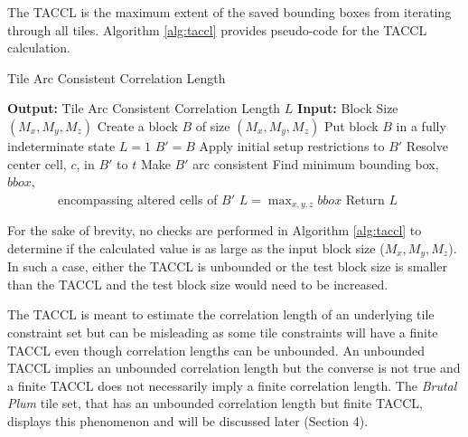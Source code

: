 The TACCL is the maximum extent of the saved bounding boxes from iterating through all tiles.
Algorithm \ref{alg:taccl} provides pseudo-code for the TACCL calculation.

\begin{algorithm}
  \caption{Tile Arc Consistent Correlation Length}
  \label{alg:taccl}
  \begin{algorithmic}
    \State \textbf{Output:} Tile Arc Consistent Correlation Length $L$
    \State \textbf{Input:} Block Size $(M _ x, M _ y, M _ z)$
    \State Create a block $B$ of size $(M _ x, M _ y, M _ z)$
    \State Put block $B$ in a fully indeterminate state
    \State $L=1$
      \State $B' = B$
      \State Apply initial setup restrictions to $B'$
      \State Resolve center cell, $c$, in $B'$ to $t$
      \State Make $B'$ arc consistent
      \State Find minimum bounding box, $bbox$, \\ \ \ \ \ \ \ \ \ encompassing altered cells of $B'$
        \State $L = \max _ { x, y, z } bbox $
      \EndIf
    \EndFor
    \State Return $L$
  \end{algorithmic}
\end{algorithm}

For the sake of brevity, no checks are performed in Algorithm \ref{alg:taccl} to determine if the calculated value
is as large as the input block size ($M _ x, M _ y, M _ z$).
In such a case, either the TACCL is unbounded or the test block size is smaller than the TACCL and the test block size would
need to be increased.

The TACCL is meant to estimate the correlation length of an underlying tile constraint set but can be misleading as some
tile constraints will have a finite TACCL even though correlation lengths can be unbounded.
An unbounded TACCL implies an unbounded correlation length but the converse is not true and a finite TACCL
does not necessarily imply a finite correlation length.
The \textit{Brutal Plum} tile set, that has an unbounded correlation length but finite TACCL,
displays this phenomenon and will be discussed later (Section 4).


